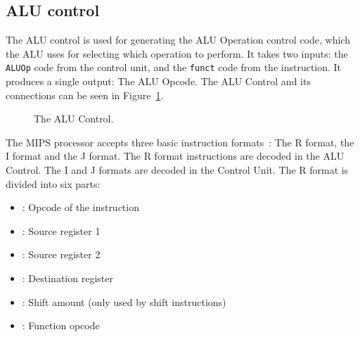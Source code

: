 \subsection{ALU control}\label{sec:alu-control}
The ALU control is used for generating the ALU Operation control code, which
the ALU uses for selecting which operation to perform. It takes two inputs: the
\texttt{ALUOp} code from the control unit, and the \texttt{funct} code from the
instruction. It produces a single output: The ALU Opcode. The ALU Control  and
its connections can be seen in Figure~\ref{fig:alu-cont}.
\begin{figure}
    \centering
    \caption{The ALU Control.}
    \label{fig:alu-cont}
\end{figure}

The MIPS processor accepts three basic instruction formats~\cite{ref:ark-book}:
The R format, the I format and the J format. The R format instructions are
decoded in the ALU Control. The I and J formats are decoded in the Control
Unit. The R format is divided into six parts:
\begin{itemize}
    \item {}
        : Opcode of the instruction
    \item {}
        : Source register 1
    \item {}
        : Source register 2
    \item {}
        : Destination register
    \item {}
        :
        Shift amount (only used by shift instructions)
    \item {}
        :   Function opcode
\end{itemize}

